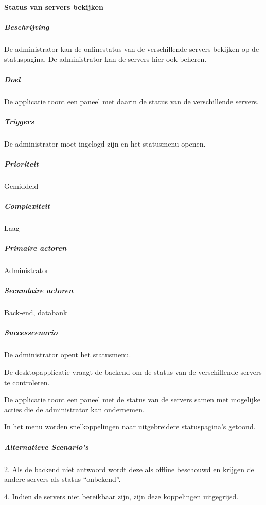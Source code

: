 \paragraph{Status van servers bekijken}
\begin{compact}
\subparagraph{Beschrijving} De administrator kan de onlinestatus van de verschillende servers bekijken op de statuspagina. De administrator kan de servers hier ook beheren.
\subparagraph{Doel} De applicatie toont een paneel met daarin de status van de verschillende servers.
\subparagraph{Triggers}De administrator moet ingelogd zijn en het statusmenu openen.
\subparagraph{Prioriteit}Gemiddeld
\subparagraph{Complexiteit}Laag
\subparagraph{Primaire actoren}Administrator
\subparagraph{Secundaire actoren}Back-end, databank
\subparagraph{Successcenario}
\begin{enumerate_compact}
 \item De administrator opent het statusmenu.
 \item De desktopapplicatie vraagt de backend om de status van de verschillende servers te controleren.
 \item De applicatie toont een paneel met de status van de servers samen met mogelijke acties die de administrator kan ondernemen.
 \item In het menu worden snelkoppelingen naar uitgebreidere statuspagina's getoond.
\end{enumerate_compact}
\subparagraph{Alternatieve Scenario's}
\begin{enumerate_compact}
	\item[2.] Als de backend niet antwoord wordt deze als offline beschouwd en krijgen de andere servers als status ``onbekend''.
	\item[4.] Indien de servers niet bereikbaar zijn, zijn deze koppelingen uitgegrijsd.
\end{enumerate_compact}
\end{compact}

